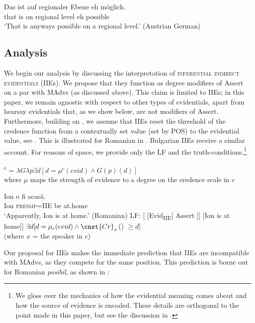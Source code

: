 \documentclass[output=paper,
]{langscibook}
\begin{document}
 	\ea \gll Das ist auf regionaler Ebene eh m\"oglich. \\ 
    	that is on regional level eh possible \\ 
		\glt `That is anyways possible on a regional level.' \hfill (Austrian German) \label{ehAG}
	\z 
    

\subsection{Analysis}
 We begin our analysis by discussing the interpretation of \textsc{inferential indirect evidentials} (IIEs). We propose that they function as degree modifiers of Assert on a par with MAdvs (as discussed above). This claim is limited to IIEs; in this paper, we remain agnostic with respect to other types of evidentials, apart from hearsay evidentials that, as we show below, are not modifiers of Assert.  Furthermore, building on \citet{davetal07}, we assume that IIEs reset the threshold of the credence function from a contextually set value (set by POS) to the evidential value, see . This is illustrated for Romanian in . Bulgarian IIEs receive a similar account. For reasons of space, we provide only the LF and the truth-conditions.\footnote{We gloss over the mechanics of how the evidential meaning comes about and how the source of evidence is encoded. These details are orthogonal to the point made in this paper, but see the discussion in \citet{koev17}.
 } 
 
	\ea {}\textsuperscript{c} = $\lambda G\lambda p\exists d[ d = \mu^{c} (evid) \wedge G(p)(d)] $\\
    where $\mu$ maps the strength of evidence to a degree on the credence scale in $c$ \label{sxiie}
    \z 
    
 	\ea  \label{rom1} \ea \gll Ion o fi acasă. \\
 			Ion \textsc{presmp}=\textsc{IIE} be at.home \\ 
			\glt `Apparently, Ion is at home.' \hfill (Romanian)
 		\ex LF: [ [Evid\textsubscript{IIE}[ Assert ]] [Ion is at home]]
        \ex $\exists d[d = \mu_{c}(evid) \wedge  \cnst{Cr}_{x}$() $\geq d ]$ \\ (where $x$ = the speaker in $c$)
        \z \z 
        

\noindent Our proposal for IIEs makes the immediate prediction that IIEs are incompatible with MAdvs, as they compete for the same position. This prediction is borne out for Romanian \textit{posibil}, as shown in :
\end{document}
